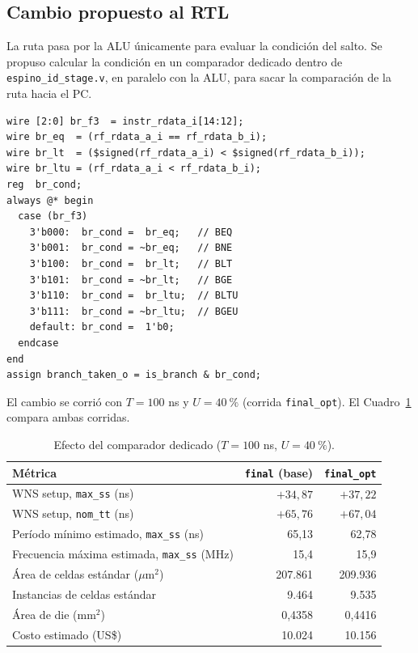 \documentclass[11pt,letterpaper]{article}
\newcommand{\code}[1]{\texttt{#1}}
\newcommand{\fuente}{\par\vspace{3pt}{\footnotesize\emph{Fuente: Elaboración propia.}}\par}
\begin{document}
\subsection{Cambio propuesto al RTL}

La ruta pasa por la ALU únicamente para evaluar la condición del salto. Se propuso calcular la condición en un comparador dedicado dentro de \code{espino\_id\_stage.v}, en paralelo con la ALU, para sacar la comparación de la ruta hacia el PC.

\begin{samepage}
\begin{lstlisting}[language=verilogx,caption={Comparador de saltos dedicado en \code{espino\_id\_stage.v} (extracto).},label={lst:cmp}]
wire [2:0] br_f3  = instr_rdata_i[14:12];
wire br_eq  = (rf_rdata_a_i == rf_rdata_b_i);
wire br_lt  = ($signed(rf_rdata_a_i) < $signed(rf_rdata_b_i));
wire br_ltu = (rf_rdata_a_i < rf_rdata_b_i);
reg  br_cond;
always @* begin
  case (br_f3)
    3'b000:  br_cond =  br_eq;   // BEQ
    3'b001:  br_cond = ~br_eq;   // BNE
    3'b100:  br_cond =  br_lt;   // BLT
    3'b101:  br_cond = ~br_lt;   // BGE
    3'b110:  br_cond =  br_ltu;  // BLTU
    3'b111:  br_cond = ~br_ltu;  // BGEU
    default: br_cond =  1'b0;
  endcase
end
assign branch_taken_o = is_branch & br_cond;
\end{lstlisting}
\end{samepage}

El cambio se corrió con $T=100$ ns y $U=40~\%$ (corrida \code{final\_opt}). El Cuadro~\ref{tab:opt} compara ambas corridas.

\begin{table}[H]
\centering
\caption{Efecto del comparador dedicado ($T=100$ ns, $U=40~\%$).}
\label{tab:opt}
\begin{tabular}{lrr}
\toprule
\textbf{Métrica} & \textbf{\code{final} (base)} & \textbf{\code{final\_opt}}\\
\midrule
WNS setup, \code{max\_ss} (ns) & $+34{,}87$ & $+37{,}22$\\
WNS setup, \code{nom\_tt} (ns) & $+65{,}76$ & $+67{,}04$\\
Período mínimo estimado, \code{max\_ss} (ns) & 65,13 & 62,78\\
Frecuencia máxima estimada, \code{max\_ss} (MHz) & 15,4 & 15,9\\
Área de celdas estándar ($\mu$m$^2$) & 207.861 & 209.936\\
Instancias de celdas estándar & 9.464 & 9.535\\
Área de die (mm$^2$) & 0,4358 & 0,4416\\
Costo estimado (US\$) & 10.024 & 10.156\\
\bottomrule
\end{tabular}
\fuente
\end{table}
\end{document}
